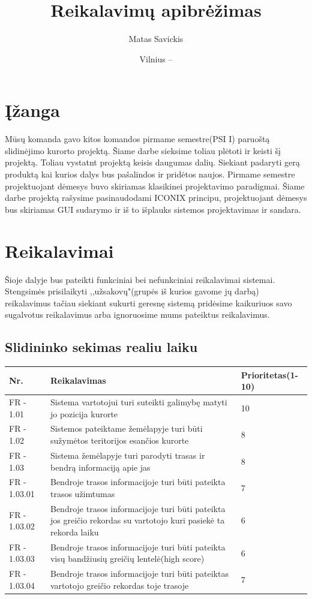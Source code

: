 \documentclass[oneside]{VUMIFPSkursinis}
\title{Reikalavimų apibrėžimas}
\author{Matas Savickis}
\date{Vilnius – \the\year}
\begin{document}
\maketitle
\tableofcontents

\section{Įžanga}
Mūsų komanda gavo kitos komandos pirmame semestre(PSI I) paruoštą slidinėjimo kurorto projektą. Šiame darbe sieksime toliau plėtoti ir keisti šį projektą. Toliau vystatnt projektą keisis daugumas dalių. Siekiant padaryti gerą produktą kai kurios  dalys bus pašalindos ir pridėtos naujos. Pirmame semestre projektuojant dėmesys buvo skiriamas klasikinei projektavimo paradigmai. Šiame darbe projektą rašysime pasinaudodami ICONIX principu, projektuojant dėmesys bus skiriamas GUI sudarymo ir iš to išplauks sistemos projektavimas ir sandara. 

\section{Reikalavimai}
Šioje dalyje bus pateikti funkciniai bei nefunkciniai reikalavimai sistemai. Stengsimės prisilaikyti ,,užsakovų"(grupės iš kurios gavome jų darbą) reikalavimus tačiau siekiant sukurti geresnę sistemą pridėsime kaikuriuos savo sugalvotus reikalavimus arba ignoruosime mums pateiktus reikalavimus. 
\subsection{Slidininko sekimas realiu laiku}


\begin{table}[htbp]
	\begin{tabularx}{1\textwidth}{ |P{2.5cm}|X|P{3cm }| }  \hline
		Nr. & Reikalavimas & Prioritetas(1-10) \\ \hline
		FR - 1.01 & Sistema vartotojui turi suteikti galimybę matyti jo pozicija kurorte & 10 \\ \hline
		FR - 1.02 & Sistemos pateiktame žemėlapyje turi būti sužymėtos teritorijos esančios kurorte & 8 \\ \hline
		FR - 1.03 & Sistema žemėlapyje turi parodyti trasas ir bendrą informaciją apie jas & 8 \\ \hline
		FR - 1.03.01 & Bendroje trasos informacijoje turi būti pateikta trasos užimtumas & 7 \\ \hline
		FR - 1.03.02 & Bendroje trasos informacijoje turi būti pateikta jos greičio rekordas su vartotojo kuri pasiekė ta rekorda laiku & 6 \\ \hline
		FR - 1.03.03 & Bendroje trasos informacijoje turi būti pateikta visų bandžiusių greičių lentelė(high score) & 6 \\ \hline
		FR - 1.03.04 & Bendroje trasos informacijoje turi būti pateiktas vartotojo greičio rekordas toje trasoje & 7 \\ \hline
		
	\end{tabularx}
\end{table}
\end{document}
